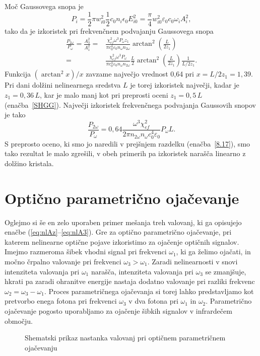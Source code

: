 Moč Gaussovega snopa je
\begin{equation}
P_{i}=\frac{1}{2}\pi w_{i0}^{2} \frac{1}{2}c_0 n_i \epsilon_{0}E_{i0}^{2}=
\frac{\pi}{4}w_{i0}^{2}\varepsilon_0 c_0 \omega_{i} A_{i}^{2},
\label{8.26}
\end{equation}
tako da je izkoristek pri frekvenčnem podvajanju Gaussovega snopa 
\begin{equation}
\begin{aligned}
\frac{P_{2\omega}}{P_{\omega}}=\frac{A_3^2}{A_1^2}  = &
\frac{\chi_{ef}^2 \omega^3 P_\omega z_1}{\pi c_0^4 \varepsilon_0 n_\omega n_{2\omega}} 
\arctan^2 \left( \frac{L}{2z_1}\right) \\
 = &\frac{\chi_{ef}^2 \omega^3 P_\omega}{\pi c_0^4 \varepsilon_0 n_\omega n_{2\omega}} \frac{L}{2}
\arctan^2 \left( \frac{L}{2z_1}\right) \frac{1}{L/2z_1}.
\label{8.27}
\end{aligned}
\end{equation}
Funkcija $(\arctan^{2}x)/x$ zavzame največjo vrednost 0,64 pri $x =L/2z_1=1,39$.
Pri dani dolžini nelinearnega sredstva $L$ je torej 
izkoristek največji, kadar je $z_{1}=0,36\,L$, kar je malo manj kot pri
preprosti oceni $z_{1}=0,5\,L$ (enačba~\ref{SHGG}). Največji izkoristek
frekvenčnega podvajanja Gaussovih snopov je tako
\begin{equation}
\frac{P_{2\omega}}{P_{\omega}}
= 0,64 \frac{\omega^3 \chi_{ef}^2}{2\pi n_{2\omega} n_{\omega} c_0^4 \varepsilon_0 } P_\omega L.
\label{8.28}
\end{equation}
S preprosto oceno, ki smo jo naredili v prejšnjem razdelku (enačba~\ref{8.17}), smo tako 
rezultat le malo zgrešili, v obeh primerih pa izkoristek narašča linearno z dolžino kristala.

\section{Optično parametrično ojačevanje}

Oglejmo si še en zelo uporaben primer mešanja treh valovanj, 
ki ga opisujejo enačbe (\ref{eq:nlAz}--\ref{eq:nlA3}). Gre za
optično parametrično ojačevanje, pri katerem nelinearne optične pojave
izkoristimo za ojačenje optičnih signalov. Imejmo razmeroma šibek vhodni
signal pri frekvenci $\omega_{1}$, ki ga želimo ojačati, in močno črpalno valovanje
pri frekvenci $\omega_{3}>\omega_{1}$. Zaradi nelinearnosti v snovi  
intenziteta valovanja pri $\omega_{1}$ narašča, 
intenziteta valovanja pri $\omega_{3}$ se zmanjšuje, hkrati pa zaradi
ohranitve energije nastaja dodatno valovanje pri razliki frekvenc
$\omega_{2}=\omega_{3}-\omega_{1}$. Proces parametričnega ojačevanja 
si torej lahko predstavljamo kot pretvorbo enega fotona pri frekvenci 
$\omega_{3}$ v dva fotona pri $\omega_{1}$ in $\omega_{2}$.
Parametrično ojačevanje pogosto uporabljamo za ojačenje šibkih signalov 
v infrardečem območju.
\begin{figure}[h]
\centering
\def\svgwidth{80truemm} 

\caption{Shematski prikaz nastanka valovanj pri optičnem parametričnem ojačevanju}
\label{fig:opa2}
\end{figure}


